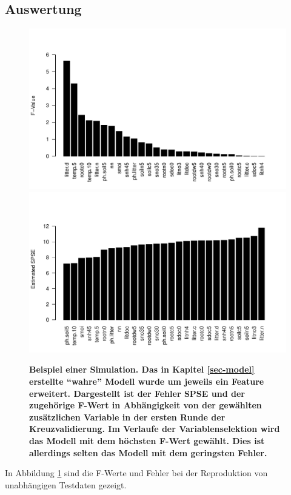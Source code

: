 \subsection{Auswertung}
\begin{figure}[htbp]
	\centering
	\includegraphics[width=\textwidth]{fig/simul/simul-f.pdf}
	\includegraphics[width=\textwidth]{fig/simul/simul-spse.pdf}
	\caption{\bf{Beispiel einer Simulation.} 
		Das in Kapitel \ref{sec-model} erstellte "`wahre"' Modell wurde um jeweils ein Feature erweitert.
		Dargestellt ist der Fehler \bf{SPSE} und der zugehörige \bf{F-Wert} in Abhängigkeit von der gewählten zusätzlichen Variable in der ersten Runde der Kreuzvalidierung.
		Im Verlaufe der Variablenselektion wird das Modell mit dem höchsten F-Wert gewählt.
		Dies ist allerdings selten das Modell mit dem geringsten Fehler.
	}
	\label{fig-simul-f-spse}
\end{figure}
In Abbildung \ref{fig-simul-f-spse} sind die F-Werte und Fehler bei der Reproduktion von unabhängigen Testdaten gezeigt.
